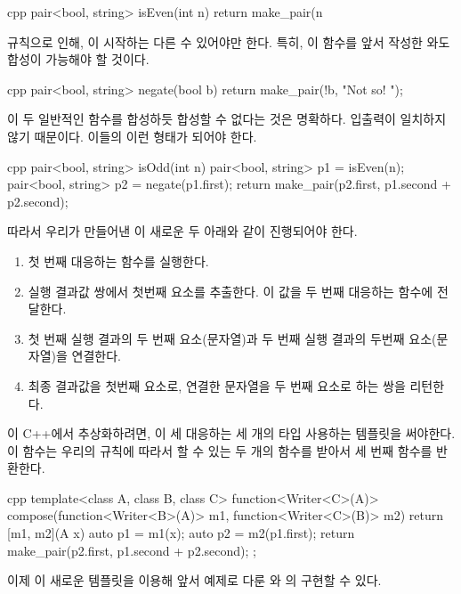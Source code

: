 \begin{snip}{cpp}
pair<bool, string> isEven(int n) {
    return make_pair(n %
}
\end{snip}
 규칙으로 인해, 이    시작하는 다른   수 있어야만 한다.
특히, 이 함수를 앞서 작성한 와도 합성이 가능해야 할 것이다.

\begin{snip}{cpp}
pair<bool, string> negate(bool b) {
    return make_pair(!b, "Not so! ");
}
\end{snip}
이 두 \trMorphism\를 일반적인 함수를 합성하듯 합성할 수 없다는 것은 명확하다. 입출력이 일치하지 않기 때문이다. 이들의 \trComposition\은 이런 형태가 되어야 한다.

\begin{snip}{cpp}
pair<bool, string> isOdd(int n) {
    pair<bool, string> p1 = isEven(n);
    pair<bool, string> p2 = negate(p1.first);
    return make_pair(p2.first, p1.second + p2.second);
}
\end{snip}
따라서 우리가 만들어낸 이 새로운  두   아래와 같이 진행되어야 한다. 

\begin{enumerate}
\tightlist
\item
  첫 번째  대응하는  함수를 실행한다.
\item
  실행 결과값 쌍에서 첫번째 요소를 추출한다. 이 값을 두 번째  대응하는  함수에 전달한다.
\item
  첫 번째 실행 결과의 두 번째 요소(문자열)과 두 번째 실행 결과의 두번째 요소(문자열)을 연결한다.
\item
  최종 결과값을 첫번째 요소로, 연결한 문자열을 두 번째 요소로 하는 쌍을 리턴한다.
\end{enumerate}

이  C++에서  추상화하려면, 이  세  대응하는 세 개의 타입  사용하는 템플릿을 써야한다.
이 함수는 우리의 규칙에 따라서 \trComposition 할 수 있는 두 개의  함수를 받아서 세 번째  함수를 반환한다.

\begin{snip}{cpp}
template<class A, class B, class C>
function<Writer<C>(A)> compose(function<Writer<B>(A)> m1,
                               function<Writer<C>(B)> m2)
{
    return [m1, m2](A x) {
        auto p1 = m1(x);
        auto p2 = m2(p1.first);
        return make_pair(p2.first, p1.second + p2.second); 
    };
}
\end{snip}
이제 이 새로운 템플릿을 이용해 앞서 예제로 다룬 와 의  구현할 수 있다.


